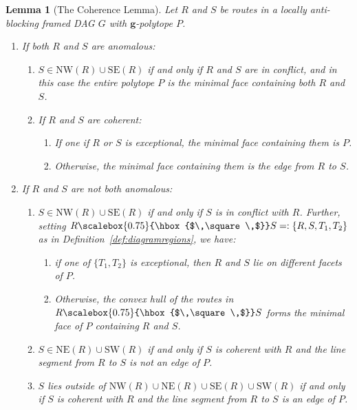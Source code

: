 \documentclass[12pt]{amsart}
\newtheorem{lemma}[theorem]{Lemma}
\theoremstyle{definition}
\newcommand\bg{\mathbf{g}}
\newcommand\NW{\mathrm{NW}}
\newcommand\NE{\mathrm{NE}}
\newcommand\SW{\mathrm{SW}}
\newcommand\SE{\mathrm{SE}}
\newcommand\squarette{\scalebox{0.75}{\hbox{$\,\square\,$}}}
\begin{document}
\begin{lemma}[The Coherence Lemma]\label{lem:thecoherencelemma}
    Let $R$ and $S$ be routes in a locally anti-blocking framed DAG $G$ with $\bg$-polytope $P$.
    \begin{enumerate}[label=(\roman*)]

    \item If both $R$ and $S$ are anomalous:
    \begin{enumerate}
        \item $S\in \NW(R)\cup \SE(R)$ if and only if $R$ and $S$ are in conflict, and in this case the entire polytope $P$ is the minimal face containing both $R$ and $S$. 
        \item If $R$ and $S$ are coherent:
        \begin{enumerate}
            \item If one if $R$ or $S$ is exceptional, the minimal face containing them is $P$.
            \item Otherwise, the minimal face containing them is the edge from $R$ to $S$.
        \end{enumerate}
    \end{enumerate}
    \item If $R$ and $S$ are not both anomalous:
    \begin{enumerate}
        \item $S\in \NW(R) \cup \SE(R)$ if and only if $S$ is in conflict with $R$.
        Further, setting $R\squarette  S =: \{R, S, T_1, T_2\}$ as in Definition~\ref{def:diagramregions}, we have:
    \begin{enumerate}
        \item if one of $\{T_1,T_2\}$ is exceptional, then $R$ and $S$ lie on different facets of $P$.
        \item Otherwise, the convex hull of the routes in $R\squarette  S$ forms the minimal face of $P$ containing $R$ and $S$.
        \end{enumerate}     
        \item $S \in \NE(R) \cup \SW(R)$ if and only if $S$ is coherent with $R$ and the line segment from $R$ to $S$ is not an edge of $P$.
        \item $S$ lies outside of $\NW(R)\cup \NE(R)\cup \SE(R)\cup \SW(R)$ if and only if $S$ is coherent with $R$ and the line segment from $R$ to $S$ is an edge of $P$.
    \end{enumerate}
    \end{enumerate}
\end{lemma}
\end{document}
